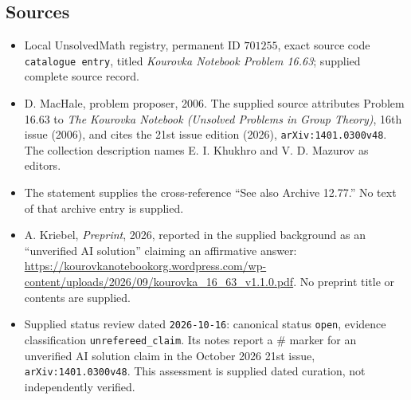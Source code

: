 \documentclass[11pt]{article}
\begin{document}
\subsection{Sources}
\begin{itemize}
\item Local UnsolvedMath registry, permanent ID \(701255\), exact source code \texttt{catalogue entry}, titled \emph{Kourovka Notebook Problem 16.63}; supplied complete source record.
\item D. MacHale, problem proposer, 2006. The supplied source attributes Problem 16.63 to \emph{The Kourovka Notebook (Unsolved Problems in Group Theory)}, 16th issue (2006), and cites the 21st issue edition (2026), \texttt{arXiv:1401.0300v48}. The collection description names E. I. Khukhro and V. D. Mazurov as editors.
\item The statement supplies the cross-reference ``See also Archive 12.77.'' No text of that archive entry is supplied.
\item A. Kriebel, \emph{Preprint}, 2026, reported in the supplied background as an ``unverified AI solution'' claiming an affirmative answer: \url{https://kourovkanotebookorg.wordpress.com/wp-content/uploads/2026/09/kourovka_16_63_v1.1.0.pdf}. No preprint title or contents are supplied.
\item Supplied status review dated \texttt{2026-10-16}: canonical status \texttt{open}, evidence classification \texttt{unrefereed\_claim}. Its notes report a \(\#\) marker for an unverified AI solution claim in the October 2026 21st issue, \texttt{arXiv:1401.0300v48}. This assessment is supplied dated curation, not independently verified.
\end{itemize}
\end{document}
